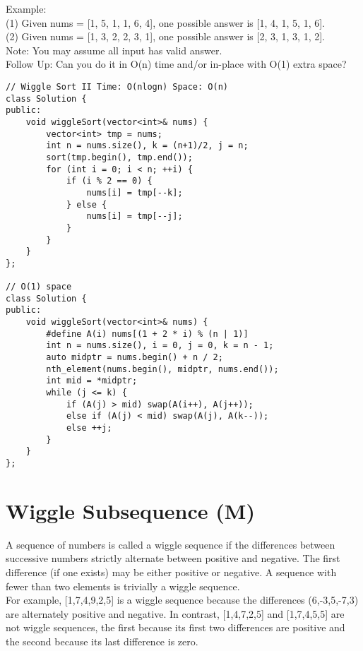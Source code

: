 Example:\\
(1) Given nums = [1, 5, 1, 1, 6, 4], one possible answer is [1, 4, 1, 5, 1, 6]. \\
(2) Given nums = [1, 3, 2, 2, 3, 1], one possible answer is [2, 3, 1, 3, 1, 2].\\

Note: You may assume all input has valid answer.\\

Follow Up: Can you do it in O(n) time and/or in-place with O(1) extra space?\\

\begin{lstlisting}
// Wiggle Sort II Time: O(nlogn) Space: O(n)
class Solution {
public:
    void wiggleSort(vector<int>& nums) {
        vector<int> tmp = nums;
        int n = nums.size(), k = (n+1)/2, j = n;
        sort(tmp.begin(), tmp.end());
        for (int i = 0; i < n; ++i) {
            if (i % 2 == 0) {
                nums[i] = tmp[--k];
            } else {
                nums[i] = tmp[--j];
            }
        }
    }
};

// O(1) space
class Solution {
public:
    void wiggleSort(vector<int>& nums) {
        #define A(i) nums[(1 + 2 * i) % (n | 1)]
        int n = nums.size(), i = 0, j = 0, k = n - 1;
        auto midptr = nums.begin() + n / 2;
        nth_element(nums.begin(), midptr, nums.end());
        int mid = *midptr;
        while (j <= k) {
            if (A(j) > mid) swap(A(i++), A(j++));
            else if (A(j) < mid) swap(A(j), A(k--));
            else ++j;
        }
    }
};
\end{lstlisting}


\section{Wiggle Subsequence (M)}
A sequence of numbers is called a wiggle sequence if the differences between successive numbers strictly alternate between positive and negative. The first difference (if one exists) may be either positive or negative. A sequence with fewer than two elements is trivially a wiggle sequence.\\

For example, [1,7,4,9,2,5] is a wiggle sequence because the differences (6,-3,5,-7,3) are alternately positive and negative. In contrast, [1,4,7,2,5] and [1,7,4,5,5] are not wiggle sequences, the first because its first two differences are positive and the second because its last difference is zero.\\

